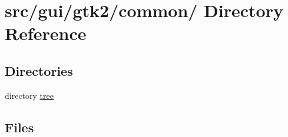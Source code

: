 \hypertarget{dir_000004}{
\section{src/gui/gtk2/common/ Directory Reference}
\label{dir_000004}
}
\subsection*{Directories}
\begin{CompactItemize}
\item 
directory \hyperlink{dir_000015}{tree}
\end{CompactItemize}
\subsection*{Files}
